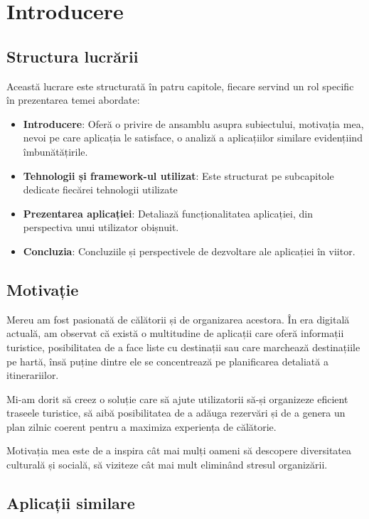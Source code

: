 \chapter{Introducere}

\section{Structura lucrării}

Această lucrare este structurată în patru capitole, fiecare servind un rol specific în prezentarea temei abordate:

\begin{itemize}
    \item \textbf{Introducere}: Oferă o privire de ansamblu asupra subiectului, motivația mea, nevoi pe care aplicația le satisface, o analiză a aplicațiilor similare evidențiind îmbunătățirile.
    \item \textbf{Tehnologii și framework-ul utilizat}: Este structurat pe subcapitole dedicate fiecărei tehnologii utilizate
    \item \textbf{Prezentarea aplicației}: Detaliază funcționalitatea aplicației, din perspectiva unui utilizator obișnuit.
    \item \textbf{Concluzia}: Concluziile și perspectivele de dezvoltare ale aplicației în viitor.
\end{itemize}

\section{Motivație}
Mereu am fost pasionată de călătorii și de organizarea acestora. În era digitală actuală, am observat că există o multitudine de aplicații care oferă informații turistice, posibilitatea de a face liste cu destinații sau care marchează destinațiile pe hartă, însă puține dintre ele se concentrează pe planificarea detaliată a itinerariilor. 

Mi-am dorit să creez o soluție care să ajute utilizatorii să-și organizeze eficient traseele turistice, să aibă posibilitatea de a adăuga rezervări și de a genera un plan zilnic coerent pentru a maximiza experiența de călătorie.

Motivația mea este de a inspira cât mai mulți oameni să descopere diversitatea culturală și socială, să viziteze cât mai mult eliminând stresul organizării.

\section{Aplicații similare}


